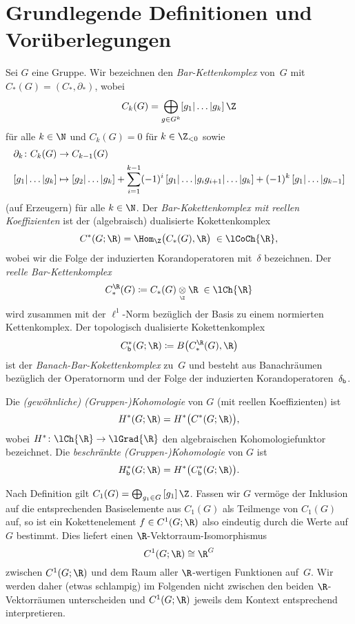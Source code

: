 \section{Grundlegende Definitionen und Vorüberlegungen}
\label{ch3:basics}%
%
Sei $G$ eine Gruppe. Wir bezeichnen den \emph{Bar-Kettenkomplex} von~$G$
mit $C_\ast(G) = (C_\ast,\partial_\ast)$, wobei
\[ C_k(G) = \bigoplus_{g\in G^k} [g_1|\ldots|g_k]\,\Z \]
für alle $k\in\N$ und $C_k(G) = 0$ für $k\in\Z_{<0}$ sowie
\begin{align*}
    \partial_k\colon C_k(G) &\to C_{k-1}(G)
    \\
    [g_1|\ldots|g_k] &\mapsto [g_2|\ldots|g_k]
    + \sum_{i=1}^{k-1} (-1)^i \, [g_1|\ldots|g_ig_{i+1}|\ldots|g_k]
    + (-1)^k \, [g_1|\ldots|g_{k-1}]
\end{align*}
(auf Erzeugern) für alle $k\in\N$. Der \emph{Bar-Kokettenkomplex mit reellen
Koeffizienten} ist der (algebraisch) dualisierte Kokettenkomplex
\[ C^\ast(G;\R) = \Hom_\Z\bigl( C_\ast(G), \R \bigr)  \;\in\lCoCh{\R} , \]
wobei wir die Folge der induzierten Korandoperatoren mit~$\delta$ bezeichnen.
Der \emph{reelle Bar-Kettenkomplex}
\[ C_\ast^{\R}(G)
    \defeq C_\ast(G) \underset{\scriptscriptstyle\Z}\otimes \R
    \;\in\lCh{\R}
\]
wird zusammen mit der $\ell^1$-Norm bezüglich der Basis zu einem
normierten Kettenkomplex. Der topologisch dualisierte Kokettenkomplex
\[ \Cb^\ast(G;\R) \defeq B\bigl( C_\ast^{\R}(G), \R \bigr) \]
ist der \emph{Banach-Bar-Kokettenkomplex} zu~$G$ und
besteht aus Banachräumen bezüglich der Operatornorm und der Folge der
induzierten Korandoperatoren~$\delta_{\mathsf{b}}$.

Die \emph{(gewöhnliche) (Gruppen-)Kohomologie} von $G$ (mit reellen
Koeffizienten) ist
\[ H^\ast(G;\R) = H^\ast\bigl( C^\ast(G;\R) \bigr)  , \]
wobei $H^\ast\colon\lCh{\R}\to\lGrad{\R}$ den algebraischen Kohomologiefunktor
bezeichnet. Die \emph{beschränkte (Gruppen-)Kohomologie} von $G$ ist
\[ \Hb^\ast(G;\R) = H^\ast\bigl( \Cb^\ast(G;\R) \bigr)  . \]

Nach Definition gilt $C_1(G) = \bigoplus_{g_1\in G}\, [g_1]\,\Z$. Fassen wir
$G$ vermöge der Inklusion auf die entsprechenden Basiselemente aus $C_1(G)$
als Teilmenge von $C_1(G)$ auf, so ist ein Kokettenelement $f\in C^1(G;\R)$ also 
eindeutig durch die Werte auf $G$ bestimmt. Dies liefert einen
$\R$-Vektorraum-Isomorphismus 
\[ C^1(G;\R) \cong \R^G  \]
zwischen $C^1(G;\R)$ und dem Raum aller $\R$-wertigen Funktionen auf~$G$.
Wir werden daher (etwas schlampig) im Folgenden nicht zwischen den beiden
$\R$-Vektorräumen unterscheiden und $C^1(G;\R)$ jeweils dem Kontext entsprechend
interpretieren.


